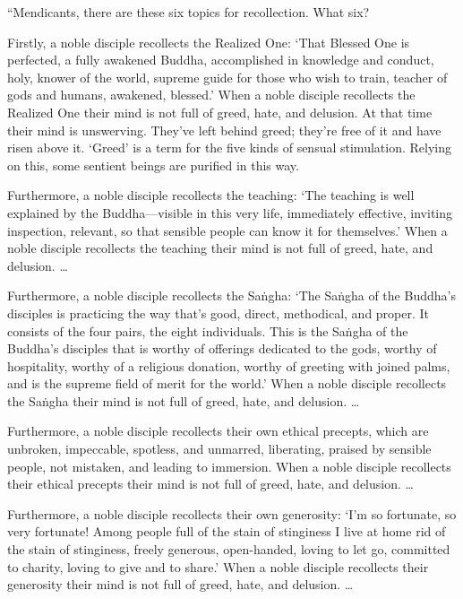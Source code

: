 \documentclass[12pt,openany]{book}%
\begin{document}
“Mendicants, there are these six topics for recollection. What six? 

Firstly, a noble disciple recollects the Realized One: ‘That Blessed One is perfected, a fully awakened Buddha, accomplished in knowledge and conduct, holy, knower of the world, supreme guide for those who wish to train, teacher of gods and humans, awakened, blessed.’ When a noble disciple recollects the Realized One their mind is not full of greed, hate, and delusion. At that time their mind is unswerving. They’ve left behind greed; they’re free of it and have risen above it. ‘Greed’ is a term for the five kinds of sensual stimulation. Relying on this, some sentient beings are purified in this way. 

Furthermore, a noble disciple recollects the teaching: ‘The teaching is well explained by the Buddha—visible in this very life, immediately effective, inviting inspection, relevant, so that sensible people can know it for themselves.’ When a noble disciple recollects the teaching their mind is not full of greed, hate, and delusion. … 

Furthermore, a noble disciple recollects the \textsanskrit{Saṅgha}: ‘The \textsanskrit{Saṅgha} of the Buddha’s disciples is practicing the way that’s good, direct, methodical, and proper. It consists of the four pairs, the eight individuals. This is the \textsanskrit{Saṅgha} of the Buddha’s disciples that is worthy of offerings dedicated to the gods, worthy of hospitality, worthy of a religious donation, worthy of greeting with joined palms, and is the supreme field of merit for the world.’ When a noble disciple recollects the \textsanskrit{Saṅgha} their mind is not full of greed, hate, and delusion. … 

Furthermore, a noble disciple recollects their own ethical precepts, which are unbroken, impeccable, spotless, and unmarred, liberating, praised by sensible people, not mistaken, and leading to immersion. When a noble disciple recollects their ethical precepts their mind is not full of greed, hate, and delusion. … 

Furthermore, a noble disciple recollects their own generosity: ‘I’m so fortunate, so very fortunate! Among people full of the stain of stinginess I live at home rid of the stain of stinginess, freely generous, open-handed, loving to let go, committed to charity, loving to give and to share.’ When a noble disciple recollects their generosity their mind is not full of greed, hate, and delusion. … 
\end{document}

